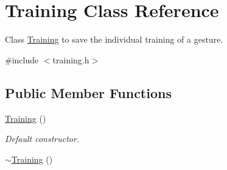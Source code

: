 \hypertarget{class_training}{\section{Training Class Reference}
\label{class_training}
}


Class \hyperlink{class_training}{Training} to save the individual training of a gesture.  




{\ttfamily \#include $<$training.\-h$>$}

\subsection*{Public Member Functions}
\begin{DoxyCompactItemize}
\item 
\hypertarget{class_training_af98b1bc7ed710e2fa008a72ad29dbdae}{\hyperlink{class_training_af98b1bc7ed710e2fa008a72ad29dbdae}{Training} ()}\label{class_training_af98b1bc7ed710e2fa008a72ad29dbdae}

\begin{DoxyCompactList}\small\item\em Default constructor. \end{DoxyCompactList}\item 
\hypertarget{class_training_a6db6a1a9302641ca0d74308e583667af}{\hyperlink{class_training_a6db6a1a9302641ca0d74308e583667af}{$\sim$\-Training} ()}\label{class_training_a6db6a1a9302641ca0d74308e583667af}


\end{DoxyCompactItemize}
